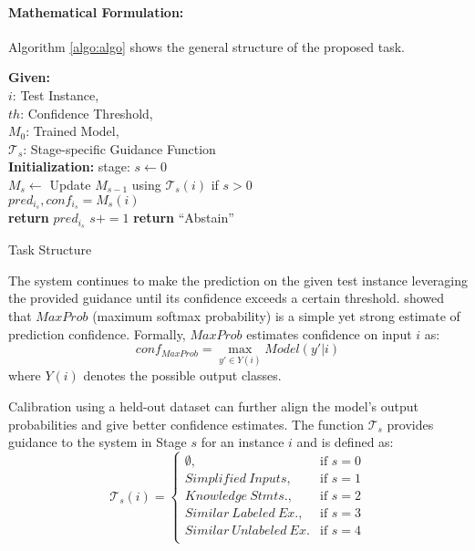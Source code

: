 \documentclass[11pt,a4paper]{article}
\begin{document}
\paragraph{Mathematical Formulation:}
Algorithm \ref{algo:algo} shows the general structure of the proposed task.
\newcommand{\pluseq}{\mathrel{+}=}
\begin{algorithm}
\SetAlgoLined
\textbf{Given:} \\
$i$: Test Instance, \\ 
$th$: Confidence Threshold, \\
$M_0$: Trained Model, \\
$\mathcal{T}_s$: Stage-specific Guidance Function \\
\textbf{Initialization:} stage: $s \leftarrow  0$\\
{
    $M_s \leftarrow$ Update $M_{s-1}$ using $\mathcal{T}_s(i)$ if $s > 0$\\
    $pred_{i_s}, conf_{i_s} = M_s(i)$\\
    {
        \textbf{return} $pred_{i_s}$
    }
    $s += 1$
}
\textbf{return} ``Abstain''
 \caption{Task Structure}
 \label{algo:algo}
\end{algorithm}
The system continues to make the prediction on the given test instance leveraging the provided guidance until its confidence exceeds a certain threshold.
\citet{hendrycks17baseline} showed that $MaxProb$ (maximum softmax probability) is a simple yet strong estimate of prediction confidence.
Formally, $MaxProb$ estimates confidence on input $i$ as:
\begin{equation*}
    conf_{MaxProb} = \max_{y'\in Y(i)} Model(y'|i)
\end{equation*}
where $Y(i)$ denotes the possible output classes.

Calibration using a held-out dataset can further align the model's output probabilities \cite{lee2017training, kamath-etal-2020-selective} and give better confidence estimates.
The function $\mathcal{T}_s$ provides guidance to the system in Stage $s$ for an instance $i$ and is defined as:
\begin{equation*}
        \mathcal{T}_s(i) =
            \begin{cases}
              \emptyset, & \text{if $s = 0$} \\
              Simplified\ Inputs, & \text{if $s = 1$} \\
              Knowledge\ Stmts., & \text{if $s = 2$} \\
              Similar\ Labeled\ Ex., & \text{if $s = 3$} \\
              Similar\ Unlabeled\ Ex. & \text{if $s = 4$} \\
              
            \end{cases}
\end{equation*}
\end{document}
